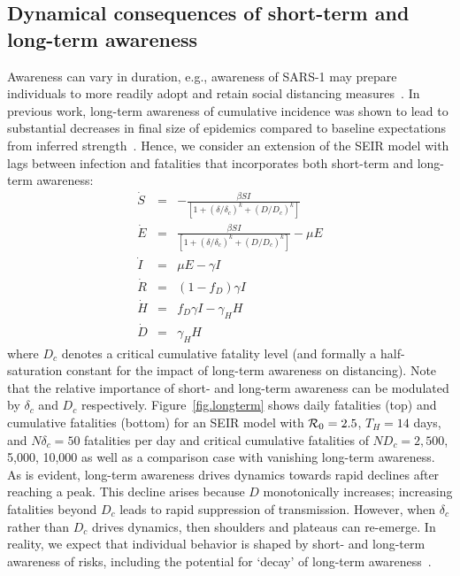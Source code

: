 \subsection{Dynamical consequences of short-term and long-term awareness}
Awareness can vary in duration, e.g., awareness
of SARS-1 may prepare individuals to more
readily adopt and retain
social distancing measures~\citep{chen_2020social,leung_lancet2020}.  
In previous
work, long-term awareness of cumulative incidence
was shown to lead to substantial decreases
in final size of epidemics compared
to baseline expectations from inferred 
strength~\citep{eksin2019systematic}. Hence, 
we consider an extension of the SEIR model
with lags between infection and fatalities that incorporates
both short-term and long-term awareness:
\begin{eqnarray}
\dot{S} &=& -\frac{\beta SI}{\left[1+\left(\delta/\delta_c\right)^{k}+\left(D/D_c\right)^k\right]}\\
\dot{E} &=& \frac{\beta SI}{\left[1+\left(\delta/\delta_c\right)^{k}+\left(D/D_c\right)^k\right]}-\mu E\\
\dot{I} &=& \mu E-\gamma I \\
\dot{R} &=& (1-f_D)\gamma I\\
\dot{H} &=& f_D\gamma I - \gamma_H H\\
\dot{D} &=& \gamma_H H
\end{eqnarray}
where $D_c$ denotes a critical cumulative fatality level
(and formally a half-saturation constant for the impact
of long-term awareness on distancing).
Note that the relative importance of short- and long-term
awareness can be modulated by $\delta_c$ and $D_c$ respectively.
Figure~\ref{fig.longterm} shows 
daily fatalities (top)
and cumulative fatalities (bottom)
for an SEIR model with ${\cal{R}}_0=2.5$, $T_H=14$ days, and $N\delta_c=50$ 
fatalities per day and critical cumulative fatalities of
$ND_c=2,500$, 5,000, 10,000 as well as a comparison case with vanishing
long-term awareness. As is evident, 
long-term awareness drives dynamics towards rapid declines
after reaching a peak. This decline arises because
$D$ monotonically increases;
increasing fatalities beyond $D_c$ leads to rapid suppression
of transmission.  However, when $\delta_c$ rather than
$D_c$ drives dynamics, then shoulders and plateaus can re-emerge.
In reality, we expect that individual
behavior is shaped by short- and long-term awareness of risks, including
the potential for `decay' of long-term awareness~\citep{funk2009spread,funk2010modelling}.

